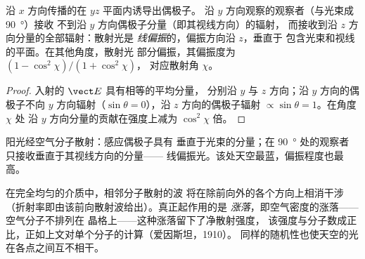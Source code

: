 \begin{proposition}[散射引起的偏振]\label{prop:b2:dipole-radiation:polarization}
沿 $x$ 方向传播的在 $yz$ 平面内诱导出偶极子。
沿 $y$ 方向观察的观察者（与光束成 \qty{90}{\degree}）接收
不到沿 $y$ 方向偶极子分量（即其视线方向）的辐射，
而接收到沿 $z$ 方向分量的全部辐射：散射光是
\emph{线偏振}的，偏振方向沿 $z$，垂直于
包含光束和视线的平面。在其他角度，散射光
部分偏振，其偏振度为 $(1 - \cos^2\chi)/(1 + \cos^2\chi)$，
对应散射角 $\chi$。
\end{proposition}

\begin{proof}
入射的 $\vect E$ 具有相等的平均分量，
分别沿 $y$ 与 $z$ 方向；沿 $y$ 方向的偶极子不向 $y$ 方向辐射（$\sin
\theta = 0$），沿 $z$ 方向的偶极子辐射 $\propto\sin\theta = 1$。在角度 $\chi$ 处
沿 $y$ 方向分量的贡献在强度上减为 $\cos^2\chi$ 倍。
\end{proof}

\begin{omfigure}

{\small 阳光经空气分子散射：感应偶极子具有
垂直于光束的分量；在 \qty{90}{\degree} 处的观察者
只接收垂直于其视线方向的分量——
线偏振光。该处天空最蓝，偏振程度也最高。}
\end{omfigure}

\begin{remark}[蓝光为何能到达我们]\label{rem:b2:dipole-radiation:why}
在完全均匀的介质中，相邻分子散射的波
将在除前向外的各个方向上相消干涉
（折射率即由该前向散射波给出）。真正起作用的是
\emph{涨落}，即空气密度的涨落——空气分子不排列在
晶格上——这种涨落留下了净散射强度，
该强度与分子数成正比，正如上文对单个分子的计算（爱因斯坦，1910）。
同样的随机性也使天空的光在各点之间互不相干。
\end{remark}

